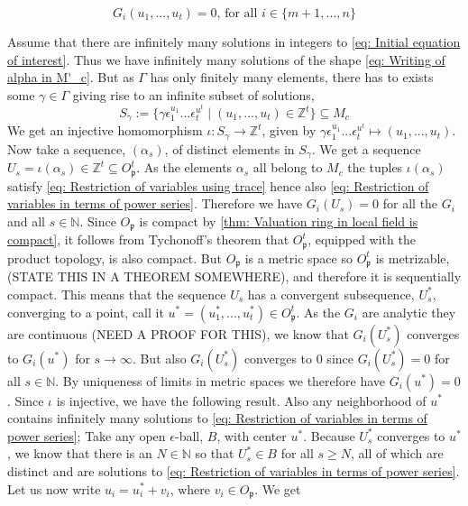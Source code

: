 \documentclass{article}
\newcommand{\mfrak}[1]{\mathfrak{#1}}
\newcommand{\mbb}[1]{\mathbb{#1}}
\begin{document}
\begin{equation}\label{eq: Restriction of variables in terms of power series}
    G_i(u_1, ..., u_t) = 0 \text{, for all } i \in \{m+1, ..., n\}
\end{equation}

Assume that there are infinitely many solutions in integers to \cref{eq: Initial equation of interest}. Thus we have infinitely many solutions of the shape \cref{eq: Writing of alpha in M'_c}. But as $\Gamma$ has only finitely many elements, there has to exists some $\gamma \in \Gamma$ giving rise to an infinite subset of solutions,
$$S_\gamma := \{\gamma \epsilon_1^{u_1} ... \epsilon_t^{u^t} \mid (u_1, ..., u_t) \in \mbb Z^t \} \subseteq M_c$$
We get an injective homomorphism $\iota : S_\gamma \to \mbb Z^t$, given by $\gamma \epsilon_1^{u_1} ... \epsilon_t^{u^t} \mapsto (u_1, ..., u_t)$. Now take a sequence, $(\alpha_s)$, of distinct elements in $S_\gamma$. We get a sequence $U_s = \iota(\alpha_s) \in \mbb Z^t \subseteq O_\mfrak p^t$. As the elements $\alpha_s$ all belong to $M_c$ the tuples $\iota(\alpha_s)$ satisfy \cref{eq: Restriction of variables using trace} hence also \cref{eq: Restriction of variables in terms of power series}. Therefore we have $G_i(U_s) = 0$ for all the $G_i$ and all $s \in \mbb N$. Since $O_\mfrak p$ is compact by \cref{thm: Valuation ring in local field is compact}, it follows from Tychonoff's theorem that $O_\mfrak p^t$, equipped with the product topology, is also compact. But $O_\mfrak p$ is a metric space so $O_\mfrak p^t$ is metrizable, (STATE THIS IN A THEOREM SOMEWHERE), and therefore it is sequentially compact. This means that the sequence $U_s$ has a convergent subsequence, $U^*_s$, converging to a point, call it $u^* = (u_1^*, ..., u_t^*) \in O_{\mfrak p}^t$. As the $G_i$ are analytic they are continuous (NEED A PROOF FOR THIS), we know that $G_i(U^*_s)$ converges to $G_i(u^*)$ for $s \to \infty$. But also $G_i(U^*_s)$ converges to 0 since $G_i(U^*_s) = 0$ for all $s \in \mbb N$. By uniqueness of limits in metric spaces we therefore have $G_i(u^*) = 0$. Since $\iota$ is injective, we have the following result. Also any neighborhood of $u^*$ contains infinitely many solutions to \cref{eq: Restriction of variables in terms of power series}; Take any open $\epsilon$-ball, $B$, with center $u^*$. Because $U^*_s$ converges to $u^*$, we know that there is an $N \in \mbb N$ so that $U^*_s \in B$ for all $s \geq N$, all of which are distinct and are solutions to \cref{eq: Restriction of variables in terms of power series}. Let us now write $u_i = u_i^* + v_i$, where $v_i \in O_\mfrak p$. We get
\end{document}
